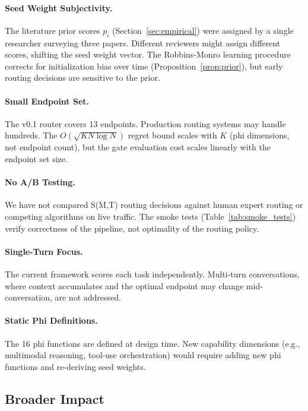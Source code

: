 \paragraph{Seed Weight Subjectivity.} The literature prior scores $p_i$ (Section~\ref{sec:empirical}) were assigned by a single researcher surveying three papers. Different reviewers might assign different scores, shifting the seed weight vector. The Robbins-Monro learning procedure corrects for initialization bias over time (Proposition~\ref{prop:prior}), but early routing decisions are sensitive to the prior.

\paragraph{Small Endpoint Set.} The v0.1 router covers 13 endpoints. Production routing systems may handle hundreds. The $O(\sqrt{KN\log N})$ regret bound scales with $K$ (phi dimensions, not endpoint count), but the gate evaluation cost scales linearly with the endpoint set size.

\paragraph{No A/B Testing.} We have not compared S(M,T) routing decisions against human expert routing or competing algorithms on live traffic. The smoke tests (Table~\ref{tab:smoke_tests}) verify correctness of the pipeline, not optimality of the routing policy.

\paragraph{Single-Turn Focus.} The current framework scores each task independently. Multi-turn conversations, where context accumulates and the optimal endpoint may change mid-conversation, are not addressed.

\paragraph{Static Phi Definitions.} The 16 phi functions are defined at design time. New capability dimensions (e.g., multimodal reasoning, tool-use orchestration) would require adding new phi functions and re-deriving seed weights.

\subsection{Broader Impact}

